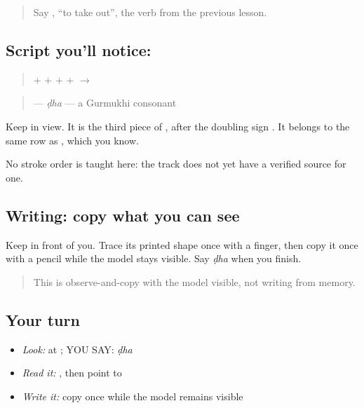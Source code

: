 \label{lesson:PA-C219-ddha}



\begin{quote}
Say \textbf{}, \textquotedblleft{}to take out\textquotedblright{}, the verb from the previous lesson.
\end{quote}

\subsection*{Script you'll notice: }
\begin{quote}
\textbf{} + \textbf{} + \textbf{} + \textbf{} + \textbf{} $\to$ \textbf{}
\end{quote}

\begin{quote}
\textbf{} — \emph{ḍha} — a Gurmukhi consonant
\end{quote}

Keep \textbf{} in view. It is the third piece of \textbf{}, after the doubling sign \textbf{}. It belongs to the same row as \textbf{}, which you know.

No stroke order is taught here: the track does not yet have a verified source for one.

\subsection*{Writing: copy what you can see}
Keep \textbf{} in front of you. Trace its printed shape once with a finger, then copy it once with a pencil while the model stays visible. Say \emph{ḍha} when you finish.

\begin{quote}
This is observe-and-copy with the model visible, not writing from memory.
\end{quote}

\subsection*{Your turn}
\begin{itemize}
\raggedright
  \item \emph{Look:} at \textbf{}; YOU SAY: \emph{ḍha}
  \item \emph{Read it:} \textbf{}, then point to \textbf{}
  \item \emph{Write it:} copy \textbf{} once while the model remains visible
\end{itemize}

